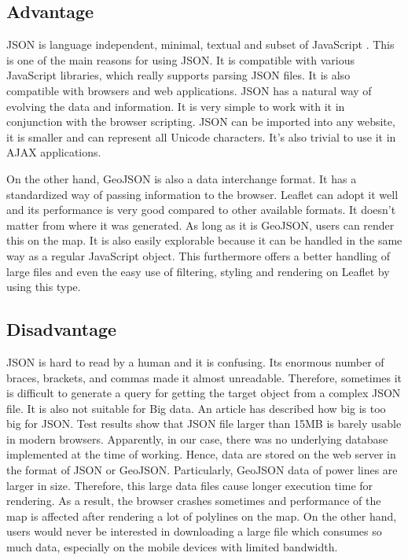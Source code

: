 \subsection{Advantage}

JSON is language independent, minimal, textual and subset of JavaScript  \cite{jsonfatfree2006}. This is one of the main reasons for using JSON. It is compatible with various JavaScript libraries, which really supports parsing JSON files. It is also compatible with browsers and web applications. JSON has a natural way of evolving the data and information. It is very simple to work with it in conjunction with the browser scripting. JSON can be imported into any website, it is smaller and can represent all Unicode characters. It's also trivial to use it in AJAX applications.
 
On the other hand, GeoJSON is also a data interchange format. It has a standardized way of passing information to the browser. Leaflet can adopt it well and its performance is very good compared to other available formats. It doesn't matter from where it was generated. As long as it is GeoJSON, users can render this on the map. It is also easily explorable because it can be handled in the same way as a regular JavaScript object. This furthermore offers a better handling of large files and even the easy use of filtering, styling and rendering on Leaflet by using this type.

\subsection{Disadvantage}

JSON is hard to read by a human and it is confusing. Its enormous number of braces, brackets, and commas made it almost unreadable. Therefore, sometimes it is difficult to generate a query for getting the target object from a complex JSON file. It is also not suitable for Big data.  An article \cite{jsontoobig} has described how big is too big for JSON.  Test results show that JSON file larger than 15MB is barely usable in modern browsers. Apparently, in our case, there was no underlying database implemented at the time of working. Hence, data are stored on the web server in the format of JSON or GeoJSON. Particularly, GeoJSON data of power lines are larger in size. Therefore, this large data files cause longer execution time for rendering. As a result, the browser crashes sometimes and performance of the map is affected after rendering a lot of polylines on the map. On the other hand, users would never be interested in downloading a large file which consumes so much data, especially on the mobile devices with limited bandwidth.

